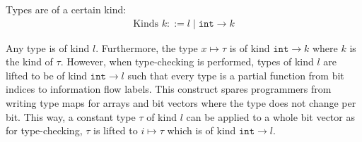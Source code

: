 Types are of a certain kind:
\begin{align*}
    \text{Kinds } k ::= l \mid \texttt{int} \rightarrow k
\end{align*}

Any type is of kind $ l $.
Furthermore, the type $ x \mapsto \tau $ is of kind $ \texttt{int} \rightarrow k $ where $ k $ is the kind of $ \tau $.
However, when type-checking is performed, types of kind $ l $ are lifted to be of kind $ \texttt{int} \rightarrow l $ such that every type is a partial function from bit indices to information flow labels.
This construct spares programmers from writing type maps for arrays and bit vectors where the type does not change per bit.
This way, a constant type $ \tau $ of kind $ l $ can be applied to a whole bit vector as for type-checking, $ \tau $ is lifted to $ i \mapsto \tau $ which is of kind $ \texttt{int} \rightarrow l $.

